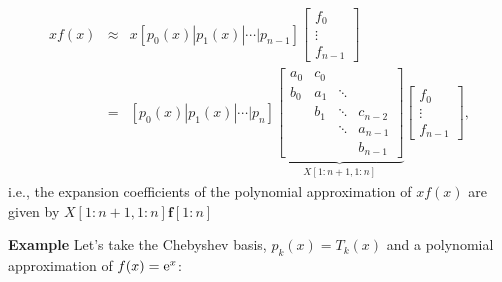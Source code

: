 \documentclass[12pt,a4paper]{article}
\begin{document}
\begin{eqnarray*}
xf(x) & \approx & x[p_0(x) | p_1(x) | \ensuremath{\cdots} | p_{n-1}]\begin{bmatrix}
f_0 \\
\vdots \\
f_{n-1}
\end{bmatrix}  \\
&=& [p_0(x) | p_1(x) | \ensuremath{\cdots} | p_{n}]
\underbrace{\begin{bmatrix}
a_0  & c_0  &     &      \\
b_0  & a_1  & \ddots    &       \\
     & b_1  & \ddots & c_{n-2}   \\
     &      & \ddots & a_{n-1}    \\
     &      &        & b_{n-1} 
\end{bmatrix}}_{X[1:n+1,1:n]}
\begin{bmatrix}
f_0 \\
\vdots \\
f_{n-1}
\end{bmatrix} ,
\end{eqnarray*}
i.e., the expansion coefficients of the polynomial approximation of $xf(x)$ are given by $X[1\!\!:\!n+1,1\!\!:\!n]\mathbf{f}[1\!\!:\!n]$

\textbf{Example} Let's take the Chebyshev basis, $p_k(x) = T_k(x)$ and a polynomial approximation of $f(x) = {\rm e}^x$:
\end{document}

